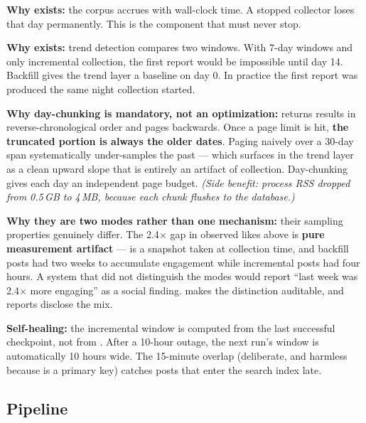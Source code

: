 \documentclass[11pt]{article}
\begin{document}
\vspace{0.4em}
\textbf{Why  exists:} the corpus accrues with wall-clock time.
A stopped collector loses that day permanently. This is the component that must
never stop.

\textbf{Why  exists:} trend detection compares two windows. With
7-day windows and only incremental collection, the first report would be
impossible until day 14. Backfill gives the trend layer a baseline on day 0. In
practice the first report was produced the same night collection started.

\textbf{Why day-chunking is mandatory, not an optimization:} 
returns results in reverse-chronological order and pages backwards. Once a page
limit is hit, \textbf{the truncated portion is always the older dates}. Paging
naively over a 30-day span systematically under-samples the past --- which
surfaces in the trend layer as a clean upward slope that is entirely an artifact
of collection. Day-chunking gives each day an independent page budget.
\emph{(Side benefit: process RSS dropped from 0.5\,GB to 4\,MB, because each
chunk flushes to the database.)}

\begin{warnbox}
\textbf{Why they are two modes rather than one mechanism:} their sampling
properties genuinely differ. The 2.4$\times$ gap in observed likes above is
\textbf{pure measurement artifact} ---  is a snapshot taken at
collection time, and backfill posts had two weeks to accumulate engagement while
incremental posts had four hours. A system that did not distinguish the modes
would report ``last week was 2.4$\times$ more engaging'' as a social finding.
 makes the distinction auditable, and reports
disclose the mix.
\end{warnbox}

\textbf{Self-healing:} the incremental window is computed from the last
successful checkpoint, not from . After a 10-hour outage, the
next run's window is automatically 10 hours wide. The 15-minute overlap
(deliberate, and harmless because  is a primary key) catches
posts that enter the search index late.

\subsection{Pipeline}
\end{document}
